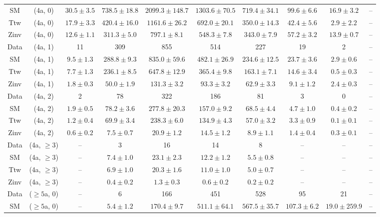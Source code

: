 \begin{table}[h!]
{\begin{tabular}{cccccccccc}
	SM & (4a, 0) & $30.5\pm 3.5$ & $738.5\pm 18.8$ & $2099.3\pm 148.7$ & $1303.6\pm 70.5$ & $719.4\pm 34.1$ & $99.6\pm 6.6$ & $16.9\pm 3.2$ & -- \\[0.5ex] 
	Ttw & (4a, 0) & $17.9\pm 3.3$ & $420.4\pm 16.0$ & $1161.6\pm 26.2$ & $692.0\pm 20.1$ & $350.0\pm 14.3$ & $42.4\pm 5.6$ & $2.9\pm 2.2$ & -- \\[0.5ex] 
	Zinv & (4a, 0) & $12.6\pm 1.1$ & $311.3\pm 5.0$ & $797.1\pm 8.1$ & $548.3\pm 7.8$ & $343.0\pm 7.9$ & $57.2\pm 3.2$ & $13.9\pm 0.7$ & -- \\[0.5ex] 
	Data & (4a, 1) & 11 & 309 & 855 & 514 & 227 & 19 & 2 & -- \\[0.5ex] 
	SM & (4a, 1) & $9.5\pm 1.3$ & $288.8\pm 9.3$ & $835.0\pm 59.6$ & $482.1\pm 26.9$ & $234.6\pm 12.5$ & $23.7\pm 3.6$ & $2.9\pm 0.6$ & -- \\[0.5ex] 
	Ttw & (4a, 1) & $7.7\pm 1.3$ & $236.1\pm 8.5$ & $647.8\pm 12.9$ & $365.4\pm 9.8$ & $163.1\pm 7.1$ & $14.6\pm 3.4$ & $0.5\pm 0.3$ & -- \\[0.5ex] 
	Zinv & (4a, 1) & $1.8\pm 0.3$ & $50.0\pm 1.9$ & $131.3\pm 3.2$ & $93.3\pm 3.2$ & $62.9\pm 3.3$ & $9.1\pm 1.2$ & $2.4\pm 0.3$ & -- \\[0.5ex] 
	Data & (4a, 2) & 2 & 78 & 322 & 186 & 81 & 3 & 0 & -- \\[0.5ex] 
	SM & (4a, 2) & $1.9\pm 0.5$ & $78.2\pm 3.6$ & $277.8\pm 20.3$ & $157.0\pm 9.2$ & $68.5\pm 4.4$ & $4.7\pm 1.0$ & $0.4\pm 0.2$ & -- \\[0.5ex] 
	Ttw & (4a, 2) & $1.2\pm 0.4$ & $69.9\pm 3.4$ & $238.3\pm 6.0$ & $134.9\pm 4.3$ & $57.0\pm 3.2$ & $3.3\pm 0.9$ & $0.1\pm 0.1$ & -- \\[0.5ex] 
	Zinv & (4a, 2) & $0.6\pm 0.2$ & $7.5\pm 0.7$ & $20.9\pm 1.2$ & $14.5\pm 1.2$ & $8.9\pm 1.1$ & $1.4\pm 0.4$ & $0.3\pm 0.1$ & -- \\[0.5ex] 
	Data & (4a, $\ge3$) & -- & 3 & 16 & 14 & 8 & -- & -- & -- \\[0.5ex] 
	SM & (4a, $\ge3$) & -- & $7.4\pm 1.0$ & $23.1\pm 2.3$ & $12.2\pm 1.2$ & $5.5\pm 0.8$ & -- & -- & -- \\[0.5ex] 
	Ttw & (4a, $\ge3$) & -- & $6.9\pm 1.0$ & $20.3\pm 1.6$ & $11.0\pm 1.0$ & $5.0\pm 0.7$ & -- & -- & -- \\[0.5ex] 
	Zinv & (4a, $\ge3$) & -- & $0.4\pm 0.2$ & $1.3\pm 0.3$ & $0.6\pm 0.2$ & $0.2\pm 0.2$ & -- & -- & -- \\[0.5ex] 
	Data & ($\ge5$a, 0) & -- & 6 & 166 & 451 & 528 & 95 & 21 & -- \\[0.5ex] 
	SM & ($\ge5$a, 0) & -- & $5.4\pm 1.2$ & $170.4\pm 9.7$ & $511.1\pm 64.1$ & $567.5\pm 35.7$ & $107.3\pm 6.2$ & $19.0\pm 259.9$ & -- \\[0.5ex] 

\end{tabular}}
\end{table}
